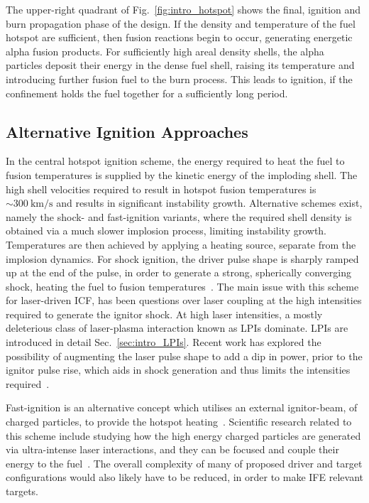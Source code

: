 The upper-right quadrant of Fig.~\ref{fig:intro_hotspot} shows the final, ignition and burn propagation phase of the design.
If the density and temperature of the fuel hotspot are sufficient, then fusion reactions begin to occur, generating energetic alpha fusion products.
For sufficiently high areal density shells, the alpha particles deposit their energy in the dense fuel shell, raising its temperature and introducing further fusion fuel to the burn process.
This leads to ignition, if the confinement holds the fuel together for a sufficiently long period.

\subsection{Alternative Ignition Approaches}%
\label{sec:intro_icf_alt}

In the central hotspot ignition scheme, the energy required to heat the fuel to fusion temperatures is supplied by the kinetic energy of the imploding shell.
The high shell velocities required to result in hotspot fusion temperatures is $\sim300\ \text{km/s}$ and results in significant instability growth.
Alternative schemes exist, namely the shock- and fast-ignition variants, where the required shell density is obtained via a much slower implosion process, limiting instability growth.
Temperatures are then achieved by applying a heating source, separate from the implosion dynamics.
For shock ignition, the driver pulse shape is sharply ramped up at the end of the pulse, in order to generate a strong, spherically converging shock, heating the fuel to fusion temperatures~\cite{betti_shock_2007,perkins_shock_2009}.
The main issue with this scheme for laser-driven \ac{ICF}, has been questions over laser coupling at the high intensities required to generate the ignitor shock.
At high laser intensities, a mostly deleterious class of laser-plasma interaction known as \ac{LPIs} dominate.
\ac{LPIs} are introduced in detail Sec.~\ref{sec:intro_LPIs}.
Recent work has explored the possibility of augmenting the laser pulse shape to add a dip in power, prior to the ignitor pulse rise, which aids in shock generation and thus limits the intensities required~\cite{scott_shockaugmented_2022}.

Fast-ignition is an alternative concept which utilises an external ignitor-beam, of charged particles, to provide the hotspot heating~\cite{tabak_ignition_1994}.
Scientific research related to this scheme include studying how the high energy charged particles are generated via ultra-intense laser interactions, and they can be focused and couple their energy to the fuel~\cite{jarrott_visualizing_2016,gong_direct_2019}.
The overall complexity of many of proposed driver and target configurations would also likely have to be reduced, in order to make \ac{IFE} relevant targets.


